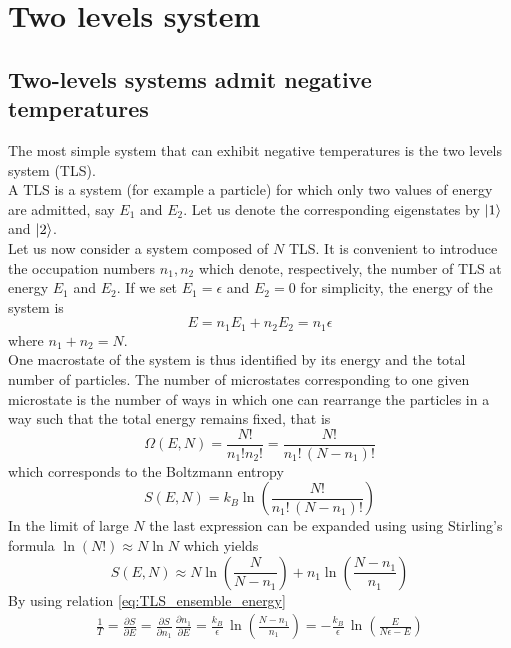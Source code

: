 \chapter{Two levels system}

\section{Two-levels systems admit negative temperatures}
The most simple system that can exhibit negative temperatures is the two levels system (TLS). \\
A TLS is a system (for example a particle) for which only two values of energy are admitted, say $E_1$ and $E_2$. Let us denote the 
corresponding eigenstates by $\left| 1 \right\rangle$ and $\left| 2 \right\rangle$. \\
Let us now consider a system composed of $N$ TLS. It is convenient to introduce the occupation numbers $n_1, n_2$ which denote,
respectively, the number of TLS at energy $E_1$ and $E_2$. If we set $E_1=\epsilon$ and $E_2=0$ for simplicity, the energy of the system is
\begin{equation}
    E = n_1 E_1 + n_2 E_2 = n_1\epsilon
    \label{eq:TLS_ensemble_energy}
\end{equation}
where $n_1 + n_2 = N$. \\
One macrostate of the system is thus identified by its energy and the total number of particles. The number of microstates corresponding 
to one given microstate is the number of ways in which one can rearrange the particles in a way such that the total energy remains fixed, that is 
\begin{equation*}
    \Omega(E, N) = \frac{N!}{n_1!n_2!} = \frac{N!}{n_1! \, (N-n_1)!}
\end{equation*}
which corresponds to the Boltzmann entropy 
\begin{equation}
    S(E, N) = k_B\ln\left(\frac{N!}{n_1! \, (N-n_1)!}\right)
    \label{eq:TLS_entropy_N}
\end{equation}
In the limit of large $N$ the last expression can be expanded using using Stirling's formula $\ln(N!) \approx N\ln N$ which yields 
\begin{equation}
    S(E, N) \approx N \ln \left(\frac{N}{N-n_1}\right) + n_1 \ln\left(\frac{N-n_1}{n_1}\right)
    \label{eq:TLS_entropy_N_approx}
\end{equation}
By using relation \ref{eq:TLS_ensemble_energy}
\begin{gather*}
    \frac{1}{T} = \frac{\partial S}{\partial E} = \frac{\partial S}{\partial n_1} \, \frac{\partial n_1}{\partial E} =
    \frac{k_B}{\epsilon} \, \ln\left(\frac{N - n_1}{n_1}\right) = -\frac{k_B}{\epsilon} \, \ln\left(\frac{E}{N\epsilon - E}\right)
\end{gather*}

